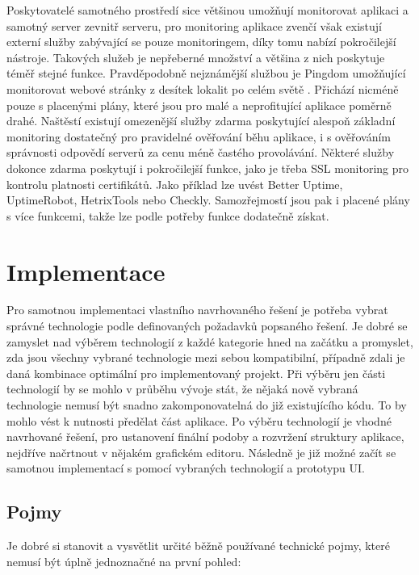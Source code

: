 		Poskytovatelé samotného prostředí sice většinou umožňují monitorovat aplikaci a samotný server zevnitř serveru,
		pro monitoring aplikace zvenčí však existují externí služby zabývající se pouze monitoringem, díky tomu nabízí pokročilejší nástroje.
		Takových služeb je nepřeberné množství a většina z nich poskytuje téměř stejné funkce.
		Pravděpodobně nejznámější službou je Pingdom umožňující monitorovat webové stránky z desítek lokalit po celém
		světě \cite{pingdom}.
		Přichází nicméně pouze s placenými plány, které jsou pro malé a neprofitující aplikace poměrně drahé.
		Naštěstí existují omezenější služby zdarma poskytující alespoň základní monitoring dostatečný pro pravidelné
		ověřování běhu aplikace, i s ověřováním správnosti odpovědí serverů za cenu méně častého provolávání.
		Některé služby dokonce zdarma poskytují i pokročilejší funkce, jako je třeba \ac{SSL} monitoring pro kontrolu
		platnosti certifikátů.
		Jako příklad lze uvést Better Uptime, UptimeRobot, HetrixTools nebo Checkly.
		Samozřejmostí jsou pak i placené plány s více funkcemi, takže lze podle potřeby funkce dodatečně získat.

\section{Implementace}

Pro samotnou implementaci vlastního navrhovaného řešení je potřeba vybrat správné technologie podle definovaných požadavků
popsaného řešení.
Je dobré se zamyslet nad výběrem technologií z každé kategorie hned na začátku a promyslet, zda jsou všechny vybrané technologie
mezi sebou kompatibilní, případně zdali je daná kombinace optimální pro implementovaný projekt.
Při výběru jen části technologií by se mohlo v průběhu vývoje stát, že nějaká nově vybraná technologie nemusí být snadno
zakomponovatelná do již existujícího kódu.
To by mohlo vést k nutnosti předělat část aplikace.
Po výběru technologií je vhodné navrhované řešení, pro ustanovení finální
podoby a rozvržení struktury aplikace, nejdříve načrtnout v nějakém grafickém editoru.
Následně je již možné začít se samotnou implementací s pomocí vybraných technologií a prototypu \ac{UI}.

	\subsection{Pojmy}

	Je dobré si stanovit a vysvětlit určité běžně používané technické pojmy, které
	nemusí být úplně jednoznačné na první pohled:

